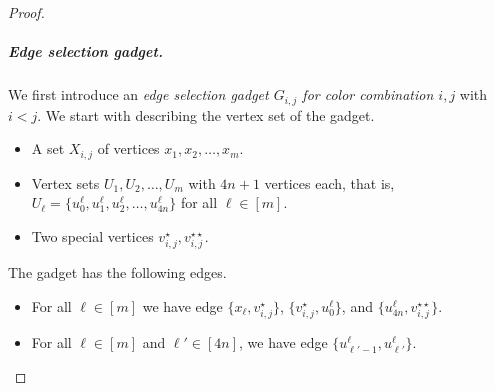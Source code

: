 \documentclass[a4paper,UKenglish,cleveref, autoref, thm-restate]{lipics-v2021}
\begin{document}
\begin{proof}
    \subparagraph{Edge selection gadget.} We first introduce an \emph{edge selection gadget $G_{i,j}$ for color combination $i,j$} with $i<j$. We start with describing the vertex set of the gadget.
    \begin{itemize}
        \item A set $X_{i,j}$ of vertices $x_1, x_2, \ldots, x_m$.
        \item Vertex sets $U_1, U_2, \ldots, U_m$ with $4n+1$ vertices each, that is, $U_\ell=\{u^\ell_0, u^\ell_1, u^\ell_2,\ldots, 
        u^\ell_{4n}\}$ for all $\ell\in[m]$. 
        \item Two special vertices $v_{i,j}^\star,v_{i,j}^{\star\star}$.
    \end{itemize}
    The gadget has the following edges.
    \begin{itemize}
        \item For all $\ell\in [m]$ we have edge $\{x_\ell,v_{i,j}^\star\}$, $\{v_{i,j}^\star,u^\ell_0\}$, and $\{u^\ell_{4n},v_{i,j}^{\star\star}\}$. 

        \item For all $\ell\in [m]$ and $\ell'\in [4n]$, we have edge $\{u^\ell_{\ell'-1},u^\ell_{\ell'}\}$.
    \end{itemize}


\end{proof}
\end{document}
